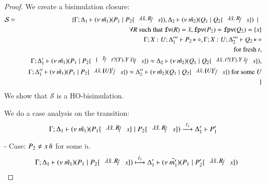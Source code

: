 \begin{proof}
	We create a bisimulation closure:
%
	\begin{eqnarray*}
		\mathcal{S} &=&
			\set{\horel{\Gamma}{\Delta_1}{\newsp{\tilde{m_1}}{P_1 \Par P_2 \subst{\abs{\tilde{x}}{R}}{x}}}{,}
			{\Delta_2}{\newsp{\tilde{m_2}}{Q_1 \Par Q_2 \subst{\abs{\tilde{x}}{R}}{x}}} \setbar \\
			&& \quad \forall R \textrm{ such that } \fv{R} = \tilde{x}, \fpv{P_2} = \fpv{Q_2} = \set{x}\\
			&& \quad \Gamma; X: U; \Delta_1''' \proves P_2 \hastype \Proc, \Gamma; X: U; \Delta_2''' \proves Q_2 \hastype \Proc\\
			&& \quad \textrm{for fresh } t,\\
			&& \quad \horel{\Gamma}{\Delta_1'}{\newsp{\tilde{m_1}}{P_1 \Par P_2 \subst{\subst{\tilde{x}}{\binp{t}{Y} \appl{Y}{\tilde{x}}}}{x}}}{\wb}{\Delta_2}{\newsp{\tilde{m_2}}{Q_1 \Par Q_2 \subst{\abs{\tilde{x}}{\binp{t}{Y} \appl{Y}{\tilde{x}}}}{x}}},\\
			&& \quad \horel{\Gamma}{\Delta_1''}{\newsp{\tilde{m_1}}{P_1 \Par P_2 \subst{\abs{\tilde{x}}{\mapchar{U}{\tilde{x}}}}{x}}}{\wb}{\Delta_2''}{\newsp{\tilde{m_2}}{Q_1 \Par Q_2 \subst{\abs{\tilde{x}}{\mapchar{U}{\tilde{x}}}}{x}} \textrm{ for some } U}\\
			&&}
	\end{eqnarray*}
%
	\noi  We show that $\mathcal{S}$ is a HO-bisimulation.

	\noi We do a case analysis on the transition:
%
	\[
		\horel{\Gamma}{\Delta_1}{\newsp{\tilde{m_1}}{P_1 \subst{\abs{\tilde{x}}{R}}{x} \Par P_2\subst{\abs{\tilde{x}}{R}}{x} }}{\by{\ell_1}}{\Delta_1'}{P_1'}
	\]
%

	\noi - Case: $P_2 \not= x\,\tilde{n}$ for some $\tilde{n}$.
%
	\begin{eqnarray*}
		&&	\horel{\Gamma}{\Delta_1}
			{\newsp{\tilde{m_1}}{P_1 \Par P_2 \subst{\abs{\tilde{x}}{R}}{x} }}
			{\hby{\ell_1}}
			{\Delta_1'}{\newsp{\tilde{m_1'}}{P_1 \Par P_2' \subst{\abs{\tilde{x}}{R}}{x}}}
	\end{eqnarray*}


\end{proof}
